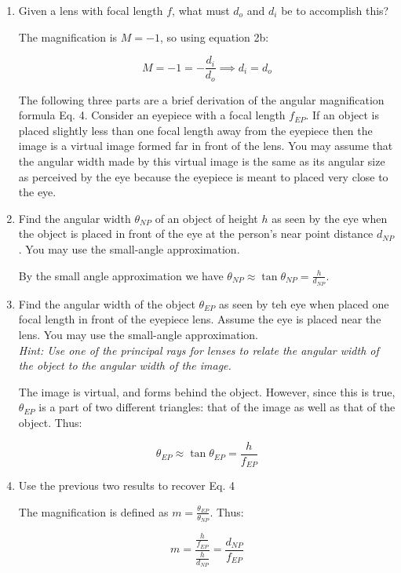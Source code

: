 \documentclass{article}
\begin{document}
\begin{enumerate}[label=\alph*)]
\item Given a lens with focal length $f$, what must $d_o$ and $d_i$ be to accomplish this?

\begin{solution}
    The magnification is $M = -1$, so using equation 2b:

    \[ M = -1 = -\frac{d_i}{d_o} \implies d_i = d_o\]
\end{solution}

The following three parts are a brief derivation of the angular magnification formula Eq. 4. Consider an eyepiece with a focal length $f_{EP}$. If an object is placed slightly less than one focal length away from the eyepiece then the image is a virtual image formed far in front of the lens. You may assume that the angular width made by this virtual image is the same as its angular size as perceived by the eye because the eyepiece is meant to placed very close to the eye.

\item Find the angular width $\theta_{NP}$ of an object of height $h$ as seen by the eye when the object is placed in front of the eye at the person's near point distance $d_{NP}$. You may use the small-angle approximation.

\begin{solution}
    By the small angle approximation we have $\theta_{NP} \approx \tan \theta_{NP} = \frac{h}{d_{NP}}$.
\end{solution}
\item Find the angular width of the object $\theta_{EP}$ as seen by teh eye when placed one focal length in front of the eyepiece lens. Assume the eye is placed near the lens. You may use the small-angle approximation. \\ \textit{Hint: Use one of the principal rays for lenses to relate the angular width of the object to the angular width of the image.}

\begin{solution}

    The image is virtual, and forms behind the object. However, since this is true, $\theta_{EP}$ is a part of two different triangles: that of the image as well as that of the object. Thus:

    \[ \theta_{EP} \approx \tan \theta_{EP} = \frac{h}{f_{EP}}\]
\end{solution}
\item Use the previous two results to recover Eq. 4

\begin{solution}
    The magnification is defined as $m = \frac{\theta_{EP}}{\theta_{NP}}$. Thus:

    \[ m = \frac{\frac{h}{f_{EP}}}{\frac{h}{d_{NP}}} = \frac{d_{NP}}{f_{EP}}\]
\end{solution}
\end{enumerate}
\end{document}
